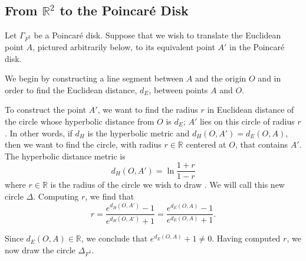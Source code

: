 \documentclass[12pt]{article}
\newcommand{\R}{\mathbb{R}}
\newcommand{\poincare}{Poincar\'{e} }
\theoremstyle{plain}
\theoremstyle{definition}
\begin{document}
\newpage
\begin{appendices}
\section{From $\R^2$ to the \poincare Disk} \label{appendixA}

Let $\Gamma_{F^2}$ be a \poincare disk. Suppose that we wish to translate the Euclidean point $A$, pictured arbitrarily below, to its equivalent point $A'$ in the \poincare disk.

\begin{center}
\end{center}

We begin by constructing a line segment between $A$ and the origin $O$ and in order to find the Euclidean distance, $d_E$, between points $A$ and $O$.

\begin{center}
\end{center}

To construct the point $A'$, we want to find the radius $r$ in Euclidean distance of the circle whose hyperbolic distance from $O$ is $d_E$; $A'$ lies on this circle of radius $r$. In other words, if $d_H$ is the hyperbolic metric and $d_H(O,A') = d_E(O,A)$, then we want to find the circle, with radius $r\in\R$ centered at $O$, that contains $A'$. The hyperbolic distance metric is
\[
	d_H(O,A') = \ln\frac{1 + r}{1 - r}
\]
where $r\in\R$ is the radius of the circle we wish to draw \cite{hyperbolic_metric}. We will call this new circle $\Delta$. Computing $r$, we find that
\[
	r = \frac{e^{d_H(O,A')} - 1}{e^{d_H(O,A')} + 1} =  \frac{e^{d_E(O,A)} - 1}{e^{d_E(O,A)} + 1}.
\]

Since $d_E(O,A)\in\R$, we conclude that $e^{d_E(O,A)} + 1 \neq 0$. Having computed $r$, we now draw the circle $\Delta_{F^2}$.


\end{appendices}
\end{document}

